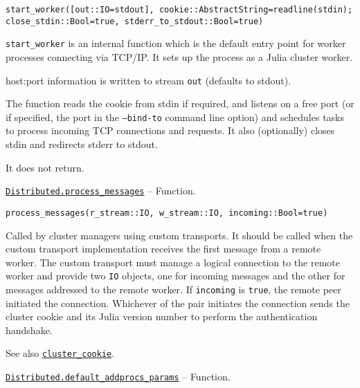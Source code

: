 \begin{adjustwidth}{2em}{0pt}


\begin{verbatim}
start_worker([out::IO=stdout], cookie::AbstractString=readline(stdin); close_stdin::Bool=true, stderr_to_stdout::Bool=true)
\end{verbatim}

\texttt{start\_worker} is an internal function which is the default entry point for worker processes connecting via TCP/IP. It sets up the process as a Julia cluster worker.

host:port information is written to stream \texttt{out} (defaults to stdout).

The function reads the cookie from stdin if required, and  listens on a free port (or if specified, the port in the \texttt{--bind-to} command line option) and schedules tasks to process incoming TCP connections and requests. It also (optionally) closes stdin and redirects stderr to stdout.

It does not return.



\end{adjustwidth}
\hypertarget{3971171154765725829}{}
\hyperlink{3971171154765725829}{\texttt{Distributed.process\_messages}}  -- {Function.}

\begin{adjustwidth}{2em}{0pt}


\begin{verbatim}
process_messages(r_stream::IO, w_stream::IO, incoming::Bool=true)
\end{verbatim}

Called by cluster managers using custom transports. It should be called when the custom transport implementation receives the first message from a remote worker. The custom transport must manage a logical connection to the remote worker and provide two \texttt{IO} objects, one for incoming messages and the other for messages addressed to the remote worker. If \texttt{incoming} is \texttt{true}, the remote peer initiated the connection. Whichever of the pair initiates the connection sends the cluster cookie and its Julia version number to perform the authentication handshake.

See also \hyperlink{914110747490695974}{\texttt{cluster\_cookie}}.



\end{adjustwidth}
\hypertarget{3015414967053633247}{}
\hyperlink{3015414967053633247}{\texttt{Distributed.default\_addprocs\_params}}  -- {Function.}

